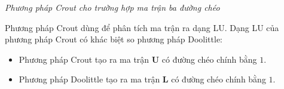 \documentclass[../../Lectures]{subfiles}
\begin{document}
\begin{method}\label{method:crout}
    \emph{Phương pháp Crout cho trường hợp ma trận ba đường chéo}

    Phương pháp Crout dùng để phân tích ma trận ra dạng LU. Dạng LU của phương
    pháp Crout có khác biệt so phương pháp Doolittle:
    \begin{itemize}
        \item Phương pháp Crout tạo ra ma trận \(\bm{U}\) có đường chéo chính
            bằng \(1\).
        \item Phương pháp Doolittle tạo ra ma trận \(\bm{L}\) có đường chéo
            chính bằng \(1\).
    \end{itemize}
\end{method}
\end{document}
